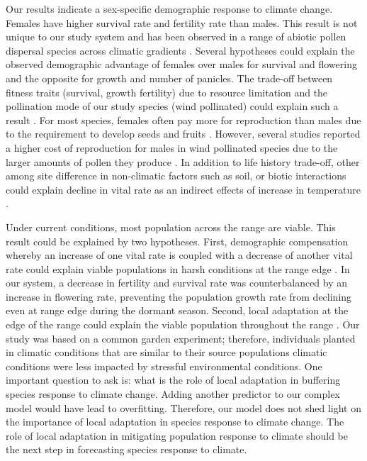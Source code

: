 \documentclass[12pt]{article}
\begin{document}
Our results indicate a sex-specific demographic response to climate change. 
Females have higher survival rate and fertility rate than males. 
This result is not unique to our study system and has been observed in a range of abiotic pollen dispersal species across climatic gradients \citep{welbergen2008climate,zhao2012sex,sasaki2019complex}. 
Several hypotheses could explain the observed demographic advantage of females over males for survival and flowering and the opposite for growth and number of panicles.
The trade-off between fitness traits (survival, growth fertility) due to resource limitation and the pollination mode of our study species (wind pollinated) could explain such a result \citep{cipollini1994sexual,freeman1976differential}.
For most species, females often pay more for reproduction than males due to the requirement to develop seeds and fruits \citep{hultine2016climate}. 
However, several studies reported a higher cost of reproduction for males in wind pollinated species due to the larger amounts of pollen they produce \citep{burli2022environmental,cipollini1994sexual,bruijning2017surviving,field2013comparative}.
In addition to life history trade-off, other among site difference in non-climatic factors such as soil, or biotic interactions could explain decline in vital rate as an indirect effects of increase in temperature \citep{alexander2015novel,schultz2022climate}.

Under current conditions, most population across the range are viable.
This result could be explained by two hypotheses.
First, demographic compensation whereby an increase of one vital rate is coupled with a decrease of another vital rate could explain viable populations in harsh conditions at the range edge \citep{doak2010demographic,villellas2015demographic,nomoto2021drivers}. 
In our system, a decrease in fertility and survival rate was counterbalanced by an increase in flowering rate, preventing the population growth rate from declining even at range edge during the dormant season.
Second, local adaptation at the edge of the range could explain the viable population throughout the range \citep{miller2022two}. 
Our study was based on a common garden experiment; therefore, individuals planted in climatic conditions that are similar to their source populations climatic conditions were less impacted by stressful environmental conditions.
One important question to ask is: what is the role of local adaptation in buffering species response to climate change.
Adding another predictor to our complex model would have lead to overfitting. 
Therefore, our model does not shed light on the importance of local adaptation in species response to climate change.  
The role of local adaptation in mitigating population response to climate should be the next step in forecasting species response to climate. 
\end{document}
